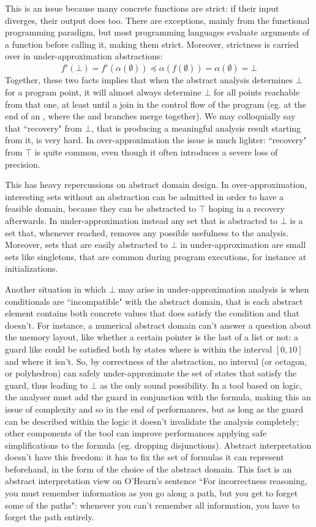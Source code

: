 This is an issue because many concrete functions are strict: if their input diverges, their output does too. There are exceptions, mainly from the functional programming paradigm, but most programming languages evaluate arguments of a function before calling it, making them strict. Moreover, strictness is carried over in under-approximation abstractions:
\[
f^{\flat}(\bot) = f^{\flat}(\alpha(\emptyset)) \preceq \alpha(f(\emptyset)) = \alpha(\emptyset) = \bot
\]
Together, these two facts implies that when the abstract analysis determines $\bot$ for a program point, it will almost always determine $\bot$ for all points reachable from that one, at least until a join in the control flow of the program (eg. at the end of an , where the  and  branches merge together). We may colloquially say that ``recovery" from $\bot$, that is producing a meaningful analysis result starting from it, is very hard.
In over-approximation the issue is much lighter: ``recovery" from $\top$ is quite common, even though it often introduces a severe loss of precision.

This has heavy repercussions on abstract domain design. In over-approximation, interesting sets without an abstraction can be admitted in order to have a feasible domain, because they can be abstracted to $\top$ hoping in a recovery afterwards. In under-approximation instead any set that is abstracted to $\bot$ is a set that, whenever reached, removes any possible usefulness to the analysis.
Moreover, sets that are easily abstracted to $\bot$ in under-approximation are small sets like singletons, that are common during program executions, for instance at initializations.

Another situation in which $\bot$ may arise in under-approximation analysis is when conditionals are ``incompatible" with the abstract domain, that is each abstract element contains both concrete values that does satisfy the condition and that doesn't.
For instance, a numerical abstract domain can't answer a question about the memory layout, like whether a certain pointer is the last of a list or not: a guard like  could be satisfied both by states where  is within the interval $[0, 10]$ and where it isn't. So, by correctness of the abstraction, no interval (or octagon, or polyhedron) can safely under-approximate the set of states that satisfy the guard, thus leading to $\bot$ as the only sound possibility.
In a tool based on logic, the analyser must add the guard in conjunction with the formula, making this an issue of complexity and so in the end of performances, but as long as the guard can be described within the logic it doesn't invalidate the analysis completely; other components of the tool can improve performances applying safe simplifications to the formula (eg. dropping disjunctions).
Abstract interpretation doesn't have this freedom: it has to fix the set of formulas it can represent beforehand, in the form of the choice of the abstract domain. This fact is an abstract interpretation view on O'Hearn's sentence \cite{ohearn-incorrectness-logic} ``For incorrectness reasoning, you must remember information as you go along a path, but you get to forget some of the paths": whenever you can't remember all information, you have to forget the path entirely.
